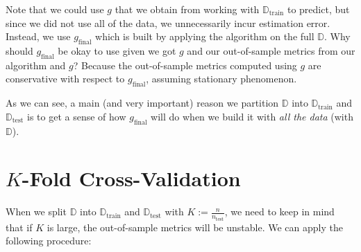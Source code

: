 \documentclass[12pt, a4paper]{article}
\theoremstyle{definition}
\begin{document}
	Note that we could use $g$ that we obtain from working with $\mathbb{D}_{\text{train}}$
	to predict, but since we did not use all of the data, we unnecessarily incur estimation
	error. Instead, we use $g_{\text{final}}$ which is built by applying
	the algorithm on the full $\mathbb{D}$. Why should $g_{\text{final}}$ be okay
	to use given we got $g$ and our out-of-sample metrics from our algorithm and $g$?
	Because the out-of-sample metrics computed using $g$ are conservative with respect to
	$g_{\text{final}}$, assuming stationary phenomenon.
	
	As we can see, a main (and very important) reason we partition $\mathbb{D}$
	into $\mathbb{D}_{\text{train}}$ and $\mathbb{D}_{\text{test}}$ is to get a sense
	of how $g_{\text{final}}$ will do when we build it with \textit{all the data}
	(with $\mathbb{D}$).
	\section*{$K$-Fold Cross-Validation}
	When we split $\mathbb{D}$ into $\mathbb{D}_{\text{train}}$ and $\mathbb{D}_{\text{test}}$
	with $K:=\frac{n}{n_{\text{test}}}$, we need to keep in mind that if $K$ is large,
	the out-of-sample metrics will be unstable. We can apply the following procedure:
\end{document}
